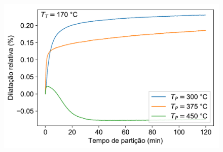 \begin{figure}
	\includegraphics[width=.9\textwidth]{img/dilatometria/dlxt_QT=170-PT.pdf}
	\caption{}
	\label{fig:QT170}
\end{figure}




